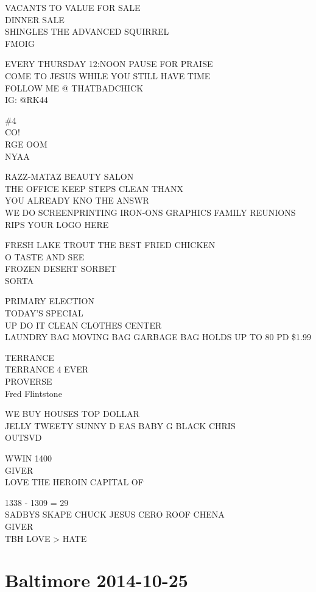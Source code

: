 \documentclass[10pt,letterpaper]{article}
\begin{document}
VACANTS TO VALUE FOR SALE\\
DINNER SALE\\
SHINGLES THE ADVANCED SQUIRREL\\
FMOIG

EVERY THURSDAY 12:NOON PAUSE FOR PRAISE\\
COME TO JESUS WHILE YOU STILL HAVE TIME\\
FOLLOW ME @ THATBADCHICK\\
IG: @RK44

\#4\\
CO!\\
RGE OOM\\
NYAA

RAZZ{-}MATAZ BEAUTY SALON\\
THE OFFICE KEEP STEPS CLEAN THANX\\
YOU ALREADY KNO THE ANSWR\\
WE DO SCREENPRINTING IRON{-}ONS GRAPHICS FAMILY REUNIONS RIPS YOUR LOGO HERE

FRESH LAKE TROUT THE BEST FRIED CHICKEN\\
O TASTE AND SEE\\
FROZEN DESERT SORBET\\
SORTA

PRIMARY ELECTION\\
TODAY'S SPECIAL\\
UP DO IT CLEAN CLOTHES CENTER\\
LAUNDRY BAG MOVING BAG GARBAGE BAG HOLDS UP TO 80 PD \$1.99

TERRANCE\\
TERRANCE 4 EVER\\
PROVERSE\\
Fred Flintstone

WE BUY HOUSES TOP DOLLAR\\
JELLY TWEETY SUNNY D EAS BABY G BLACK CHRIS\\
OUTSVD

WWIN 1400\\
GIVER\\
LOVE THE HEROIN CAPITAL OF

1338 {-} 1309 = 29\\
SADBYS SKAPE CHUCK JESUS CERO ROOF CHENA\\
GIVER\\
TBH LOVE > HATE


\section*{Baltimore 2014-10-25}
\end{document}
